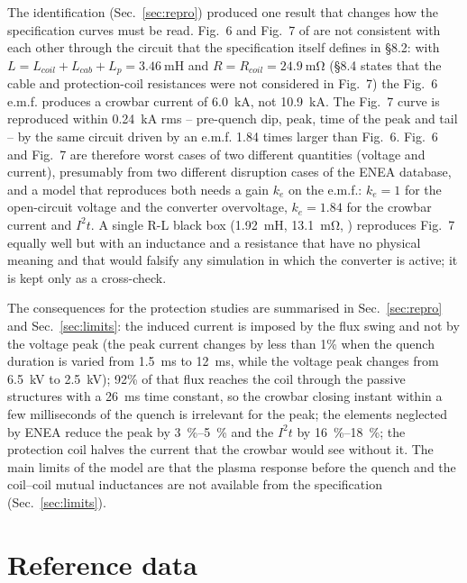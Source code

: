 \documentclass[11pt,a4paper]{article}
\begin{document}
The identification (Sec.~\ref{sec:repro}) produced one result that changes how the specification curves must be read. Fig.~6 and Fig.~7 of \cite{enea_spec} are not consistent with each other through the circuit that the specification itself defines in \S8.2: with $L = L_{coil}+L_{cab}+L_p = \SI{3.46}{\milli\henry}$ and $R = R_{coil} = \SI{24.9}{\milli\ohm}$ (\S8.4 states that the cable and protection-coil resistances were not considered in Fig.~7) the Fig.~6 e.m.f. produces a crowbar current of \SI{6.0}{\kilo\ampere}, not \SI{10.9}{\kilo\ampere}. The Fig.~7 curve is reproduced within \SI{0.24}{\kilo\ampere} rms -- pre-quench dip, peak, time of the peak and tail -- by the same circuit driven by an e.m.f. \num{1.84} times larger than Fig.~6. Fig.~6 and Fig.~7 are therefore worst cases of two different quantities (voltage and current), presumably from two different disruption cases of the ENEA database, and a model that reproduces both needs a gain $k_e$ on the e.m.f.: $k_e = 1$ for the open-circuit voltage and the converter overvoltage, $k_e = 1.84$ for the crowbar current and $I^2t$. A single R-L black box (\SI{1.92}{\milli\henry}, \SI{13.1}{\milli\ohm}, \cite{crowbar_note}) reproduces Fig.~7 equally well but with an inductance and a resistance that have no physical meaning and that would falsify any simulation in which the converter is active; it is kept only as a cross-check.

The consequences for the protection studies are summarised in Sec.~\ref{sec:repro} and Sec.~\ref{sec:limits}: the induced current is imposed by the flux swing and not by the voltage peak (the peak current changes by less than 1\% when the quench duration is varied from \SI{1.5}{\milli\second} to \SI{12}{\milli\second}, while the voltage peak changes from \SI{6.5}{\kilo\volt} to \SI{2.5}{\kilo\volt}); 92\% of that flux reaches the coil through the passive structures with a \SI{26}{\milli\second} time constant, so the crowbar closing instant within a few milliseconds of the quench is irrelevant for the peak; the elements neglected by ENEA reduce the peak by \SIrange{3}{5}{\percent} and the $I^2t$ by \SIrange{16}{18}{\percent}; the protection coil halves the current that the crowbar would see without it. The main limits of the model are that the plasma response before the quench and the coil--coil mutual inductances are not available from the specification (Sec.~\ref{sec:limits}).

\section{Reference data}
\label{sec:data}
\end{document}
